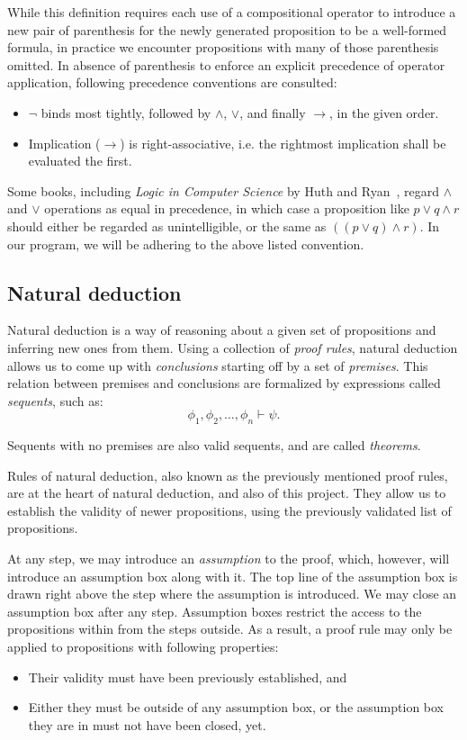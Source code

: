 \documentclass[12pt]{article}
\newcommand{\imp}{\ensuremath{\rightarrow}}
\begin{document}
While this definition requires each use of a compositional operator
to introduce a new pair of parenthesis for the newly generated
proposition to be a well-formed formula, in practice we encounter
propositions with many of those parenthesis omitted. In absence of
parenthesis to enforce an explicit precedence of operator application,
following precedence conventions are consulted:
\begin{itemize}
	\item $\neg$ binds most tightly, followed by $\land$, $\lor$, and
		finally $\imp$, in the given order.
	\item Implication ($\imp$) is right-associative, i.e. the
		rightmost implication shall be evaluated the first.
\end{itemize}

Some books, including \textit{Logic in Computer Science} by Huth and
Ryan~\cite{huth2004logic},
regard $\land$ and $\lor$ operations as equal in precedence, in which
case a proposition like $p \lor q \land r$ should either be regarded
as unintelligible, or the same as $((p \lor q) \land r)$.
In our program, we will be adhering to the above listed convention.

\subsection{Natural deduction}\label{sec:intr_nd}

Natural deduction is a way of reasoning about a given set of propositions
and inferring new ones from them. Using a collection of \textit{proof rules},
natural deduction allows us to come up with \textit{conclusions} starting
off by a set of \textit{premises}. This relation between premises and
conclusions are formalized by expressions called \textit{sequents},
such as:
$$
\phi_1, \phi_2, \dotsc, \phi_n \vdash \psi.
$$

Sequents with no premises are also valid sequents, and are called
\textit{theorems}.

Rules of natural deduction, also known as the previously mentioned
proof rules, are at the heart of natural deduction, and also of this project.
They allow us to establish the validity of newer propositions,
using the previously validated list of propositions.

At any step, we may introduce an \textit{assumption} to the proof,
which, however, will introduce an assumption box along with it.
The top line of the assumption box is drawn right above the step
where the assumption is introduced. We may close an assumption
box after any step. Assumption boxes restrict the access to the propositions
within from the steps outside. As a result, a proof rule may only be applied to
propositions with following properties:
\begin{itemize}
	\item Their validity must have been previously established, and
	\item Either they must be outside of any assumption box, or the
		assumption box they are in must not have been closed, yet.
\end{itemize}
\end{document}

